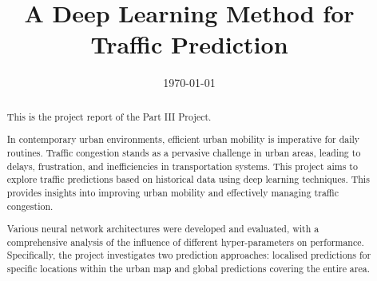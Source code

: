 \documentclass[sotoncolour]{uosprogress}    %
\title      {A Deep Learning Method for Traffic Prediction}
\date       {\today}
\begin{document}
\frontmatter
\maketitle

\begin{abstract}
    This is the project report of the Part III Project. 

    In contemporary urban environments, efficient urban mobility is imperative for daily routines. 
    Traffic congestion stands as a pervasive challenge in urban areas, leading to delays, frustration, and inefficiencies in transportation systems. 
    This project aims to explore traffic predictions based on historical data using deep learning techniques. 
    This provides insights into improving urban mobility and effectively managing traffic congestion.
    
    Various neural network architectures were developed and evaluated, with a comprehensive analysis of the influence of different hyper-parameters on performance. 
    Specifically, the project investigates two prediction approaches: localised predictions for specific locations within the urban map and global predictions covering the entire area. 
\end{abstract}



\let\cleardoublepage\clearpage


\tableofcontents

\end{document}
